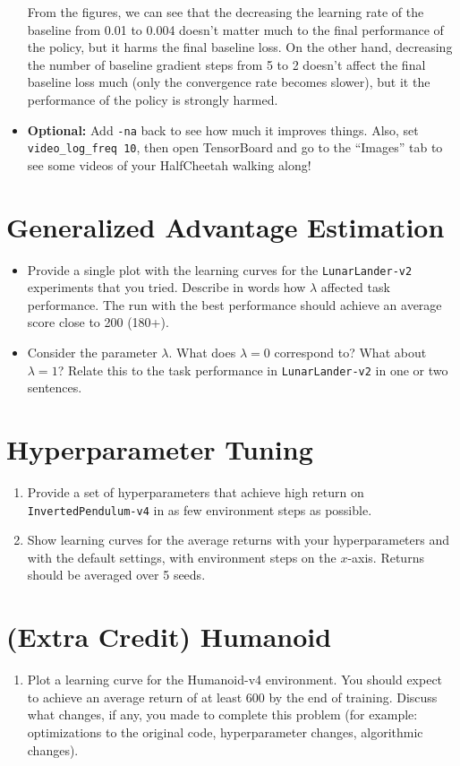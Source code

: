 \documentclass{article}
\begin{document}
\begin{itemize}
From the figures, we can see that the decreasing the learning rate of the baseline from 0.01 to 0.004 doesn't matter much to the final performance of the policy, but it harms the final baseline loss. On the other hand, decreasing the number of baseline gradient steps from 5 to 2 doesn't affect the final baseline loss much (only the convergence rate becomes slower), but it the performance of the policy is strongly harmed.

        \item \textbf{Optional:} Add \verb|-na| back to see how much it improves things. Also, set \verb|video_log_freq 10|, then open TensorBoard and go to the ``Images'' tab to see some videos of your HalfCheetah walking along!
\end{itemize}

\newpage\section{Generalized Advantage Estimation}
\begin{itemize}
        \item Provide a single plot with the learning curves for the \verb|LunarLander-v2| experiments that you tried. Describe in words how $\lambda$ affected task performance. The run with the best performance should achieve an average score close to 200 (180+).
        \item Consider the parameter $\lambda$. What does $\lambda = 0$ correspond to? What about $\lambda = 1$? Relate this to the task performance in \verb|LunarLander-v2| in one or two sentences.
\end{itemize}

\newpage\section{Hyperparameter Tuning}
\begin{enumerate}
        \item Provide a set of hyperparameters that achieve high return on \verb|InvertedPendulum-v4| in as few environment steps as possible.
        \item Show learning curves for the average returns with your hyperparameters and with the default settings, with environment steps on the $x$-axis. Returns should be averaged over 5 seeds.
\end{enumerate}

\newpage\section{(Extra Credit) Humanoid}
\begin{enumerate}
        \item Plot a learning curve for the Humanoid-v4 environment. You should expect to achieve an average return of at least 600 by the end of training. Discuss what changes, if any, you made to complete this problem (for example: optimizations to the original code, hyperparameter changes, algorithmic changes).
\end{enumerate}
\end{document}
